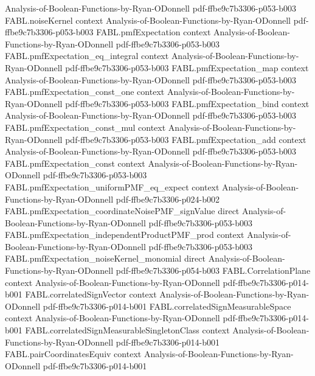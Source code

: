 \begin{theorem}
  {Analysis-of-Boolean-Functions-by-Ryan-ODonnell}
  {pdf-ffbe9c7b3306-p053-b003}
\proofstep
  {FABL.noiseKernel}
  {context}
  {Analysis-of-Boolean-Functions-by-Ryan-ODonnell}
  {pdf-ffbe9c7b3306-p053-b003}
\proofstep
  {FABL.pmfExpectation}
  {context}
  {Analysis-of-Boolean-Functions-by-Ryan-ODonnell}
  {pdf-ffbe9c7b3306-p053-b003}
\proofstep
  {FABL.pmfExpectation_eq_integral}
  {context}
  {Analysis-of-Boolean-Functions-by-Ryan-ODonnell}
  {pdf-ffbe9c7b3306-p053-b003}
\proofstep
  {FABL.pmfExpectation_map}
  {context}
  {Analysis-of-Boolean-Functions-by-Ryan-ODonnell}
  {pdf-ffbe9c7b3306-p053-b003}
\proofstep
  {FABL.pmfExpectation_const_one}
  {context}
  {Analysis-of-Boolean-Functions-by-Ryan-ODonnell}
  {pdf-ffbe9c7b3306-p053-b003}
\proofstep
  {FABL.pmfExpectation_bind}
  {context}
  {Analysis-of-Boolean-Functions-by-Ryan-ODonnell}
  {pdf-ffbe9c7b3306-p053-b003}
\proofstep
  {FABL.pmfExpectation_const_mul}
  {context}
  {Analysis-of-Boolean-Functions-by-Ryan-ODonnell}
  {pdf-ffbe9c7b3306-p053-b003}
\proofstep
  {FABL.pmfExpectation_add}
  {context}
  {Analysis-of-Boolean-Functions-by-Ryan-ODonnell}
  {pdf-ffbe9c7b3306-p053-b003}
\proofstep
  {FABL.pmfExpectation_const}
  {context}
  {Analysis-of-Boolean-Functions-by-Ryan-ODonnell}
  {pdf-ffbe9c7b3306-p053-b003}
\proofstep
  {FABL.pmfExpectation_uniformPMF_eq_expect}
  {context}
  {Analysis-of-Boolean-Functions-by-Ryan-ODonnell}
  {pdf-ffbe9c7b3306-p024-b002}
\proofstep
  {FABL.pmfExpectation_coordinateNoisePMF_signValue}
  {direct}
  {Analysis-of-Boolean-Functions-by-Ryan-ODonnell}
  {pdf-ffbe9c7b3306-p053-b003}
\proofstep
  {FABL.pmfExpectation_independentProductPMF_prod}
  {context}
  {Analysis-of-Boolean-Functions-by-Ryan-ODonnell}
  {pdf-ffbe9c7b3306-p053-b003}
\proofstep
  {FABL.pmfExpectation_noiseKernel_monomial}
  {direct}
  {Analysis-of-Boolean-Functions-by-Ryan-ODonnell}
  {pdf-ffbe9c7b3306-p054-b003}
\proofstep
  {FABL.CorrelationPlane}
  {context}
  {Analysis-of-Boolean-Functions-by-Ryan-ODonnell}
  {pdf-ffbe9c7b3306-p014-b001}
\proofstep
  {FABL.correlatedSignVector}
  {context}
  {Analysis-of-Boolean-Functions-by-Ryan-ODonnell}
  {pdf-ffbe9c7b3306-p014-b001}
\proofstep
  {FABL.correlatedSignMeasurableSpace}
  {context}
  {Analysis-of-Boolean-Functions-by-Ryan-ODonnell}
  {pdf-ffbe9c7b3306-p014-b001}
\proofstep
  {FABL.correlatedSignMeasurableSingletonClass}
  {context}
  {Analysis-of-Boolean-Functions-by-Ryan-ODonnell}
  {pdf-ffbe9c7b3306-p014-b001}
\proofstep
  {FABL.pairCoordinatesEquiv}
  {context}
  {Analysis-of-Boolean-Functions-by-Ryan-ODonnell}
  {pdf-ffbe9c7b3306-p014-b001}

\end{theorem}
